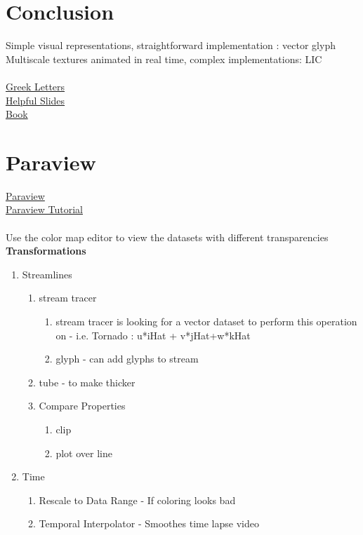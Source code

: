 \documentclass{article}
\begin{document}
\section*{Conclusion}
Simple visual representations, straightforward implementation : vector glyph
Multiscale textures animated in real time, complex implementations: LIC
\\\\
\href{https://journals.iucr.org/j/services/editguide.html}{Greek Letters}
\\
\href{https://www.cs.sjtu.edu.cn/~shengbin/course/datavis/LEC6.Vector.Visualization.pdf}{Helpful Slides}
\\
\href{https://ebookcentral-proquest-com.dist.lib.usu.edu/lib/usu/reader.action?docID=1605634&ppg=196}{Book}

\section*{Paraview}
\href{https://www.paraview.org/}{Paraview}\\
\href{https://www.paraview.org/Wiki/ParaView_Self-directed_Tutorial}{Paraview Tutorial}\\\\
Use the color map editor to view the datasets with different transparencies
\textbf{Transformations}
\begin{enumerate}
    \item Streamlines
    \begin{enumerate}
        \item stream tracer
        \begin{enumerate}
            \item stream tracer is looking for a vector dataset to perform this operation on - i.e. Tornado : u*iHat + v*jHat+w*kHat
            \item glyph - can add glyphs to stream %
        \end{enumerate}
        \item tube - to make thicker
        \item Compare Properties
        \begin{enumerate}
            \item clip
            \item plot over line %
        \end{enumerate}
    \end{enumerate}
    \item Time
    \begin{enumerate}
        \item Rescale to Data Range - If coloring looks bad %
        \item Temporal Interpolator - Smoothes time lapse video
    \end{enumerate}
\end{enumerate}
\end{document}
